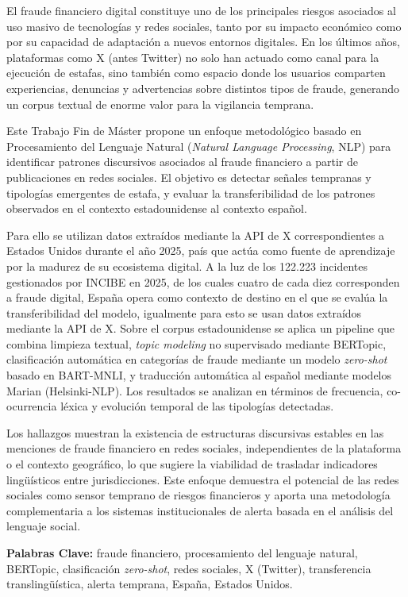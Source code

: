 El fraude financiero digital constituye uno de los principales riesgos asociados al uso masivo de tecnologías y redes sociales, tanto por su impacto económico como por su capacidad de adaptación a nuevos entornos digitales. En los últimos años, plataformas como X (antes Twitter) no solo han actuado como canal para la ejecución de estafas, sino también como espacio donde los usuarios comparten experiencias, denuncias y advertencias sobre distintos tipos de fraude, generando un corpus textual de enorme valor para la vigilancia temprana.

Este Trabajo Fin de Máster propone un enfoque metodológico basado en Procesamiento del Lenguaje Natural (\textit{Natural Language Processing}, NLP) para identificar patrones discursivos asociados al fraude financiero a partir de publicaciones en redes sociales. El objetivo es detectar señales tempranas y tipologías emergentes de estafa, y evaluar la transferibilidad de los patrones observados en el contexto estadounidense al contexto español.

Para ello se utilizan datos extraídos mediante la API de X correspondientes a Estados Unidos durante el año 2025, país que actúa como fuente de aprendizaje por la madurez de su ecosistema digital. A la luz de los 122.223 incidentes gestionados por INCIBE en 2025, de los cuales cuatro de cada diez corresponden a fraude digital, España opera como contexto de destino en el que se evalúa la transferibilidad del modelo, igualmente para esto se usan datos extraídos mediante la API de X. Sobre el corpus estadounidense se aplica un pipeline que combina limpieza textual, \textit{topic modeling} no supervisado mediante BERTopic, clasificación automática en categorías de fraude mediante un modelo \textit{zero-shot} basado en BART-MNLI, y traducción automática al español mediante modelos Marian (Helsinki-NLP). Los resultados se analizan en términos de frecuencia, co-ocurrencia léxica y evolución temporal de las tipologías detectadas.

Los hallazgos muestran la existencia de estructuras discursivas estables en las menciones de fraude financiero en redes sociales, independientes de la plataforma o el contexto geográfico, lo que sugiere la viabilidad de trasladar indicadores lingüísticos entre jurisdicciones. Este enfoque demuestra el potencial de las redes sociales como sensor temprano de riesgos financieros y aporta una metodología complementaria a los sistemas institucionales de alerta basada en el análisis del lenguaje social.

\textbf{Palabras Clave:} fraude financiero, procesamiento del lenguaje natural, BERTopic, clasificación \textit{zero-shot}, redes sociales, X (Twitter), transferencia translingüística, alerta temprana, España, Estados Unidos.
